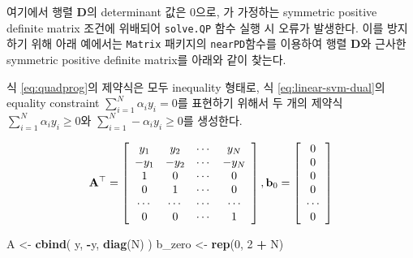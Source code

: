 \documentclass[]{book}
\newenvironment{Shaded}{\begin{snugshade}}{\end{snugshade}}
\newcommand{\DataTypeTok}[1]{\textcolor[rgb]{0.13,0.29,0.53}{#1}}
\newcommand{\DecValTok}[1]{\textcolor[rgb]{0.00,0.00,0.81}{#1}}
\newcommand{\KeywordTok}[1]{\textcolor[rgb]{0.13,0.29,0.53}{\textbf{#1}}}
\newcommand{\NormalTok}[1]{#1}
\newcommand{\OperatorTok}[1]{\textcolor[rgb]{0.81,0.36,0.00}{\textbf{#1}}}
\newcommand{\StringTok}[1]{\textcolor[rgb]{0.31,0.60,0.02}{#1}}
\begin{document}
여기에서 행렬 \(\mathbf{D}\)의 determinant 값은 0으로, \citet{goldfarb1983numerically} 가 가정하는 symmetric positive definite matrix 조건에 위배되어 \texttt{solve.QP} 함수 실행 시 오류가 발생한다. 이를 방지하기 위해 아래 예에서는 \texttt{Matrix} 패키지의 \texttt{nearPD}함수를 이용하여 행렬 \(\mathbf{D}\)와 근사한 symmetric positive definite matrix를 아래와 같이 찾는다.

\begin{Shaded}
\end{Shaded}

식 \eqref{eq:quadprog}의 제약식은 모두 inequality 형태로, 식 \eqref{eq:linear-svm-dual}의 equality constraint \(\sum_{i = 1}^{N} \alpha_i y_i = 0\)를 표현하기 위해서 두 개의 제약식 \(\sum_{i = 1}^{N} \alpha_i y_i \ge 0\)와 \(\sum_{i = 1}^{N} - \alpha_i y_i \ge 0\)를 생성한다.

\begin{equation*}
\mathbf{A}^\top = \left[ 
\begin{array}{c c c c}
y_1 & y_2 & \cdots & y_N\\
-y_1 & -y_2 & \cdots & -y_N\\
1 & 0 & \cdots & 0\\
0 & 1 & \cdots & 0\\
\cdots & \cdots & \cdots & \cdots \\
0 & 0 & \cdots & 1
\end{array}
\right],
\mathbf{b}_0 = \left[ \begin{array}{c}
0 \\ 0 \\ 0 \\ 0 \\ \cdots \\ 0
\end{array}
\right]
\end{equation*}

\begin{Shaded}
\begin{Highlighting}[]
\NormalTok{A <-}\StringTok{ }\KeywordTok{cbind}\NormalTok{(}
\NormalTok{  y,}
  \OperatorTok{-}\NormalTok{y,}
  \KeywordTok{diag}\NormalTok{(N)}
\NormalTok{)}
\NormalTok{b_zero <-}\StringTok{ }\KeywordTok{rep}\NormalTok{(}\DecValTok{0}\NormalTok{, }\DecValTok{2} \OperatorTok{+}\StringTok{ }\NormalTok{N)}
\end{Highlighting}
\end{Shaded}
\end{document}
